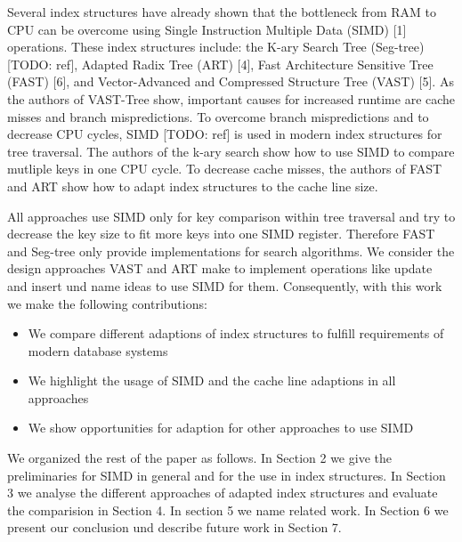 \documentclass[conference]{IEEEtran}
\begin{document}
Several index structures have already shown that the bottleneck from RAM to CPU can be overcome using Single Instruction Multiple Data (SIMD) [1] operations. These index structures include: the K-ary Search Tree (Seg-tree) [TODO: ref], Adapted Radix Tree (ART) [4], Fast Architecture Sensitive Tree (FAST) [6], and Vector-Advanced and Compressed Structure Tree (VAST) [5]. As the authors of VAST-Tree show, important causes for increased runtime are cache misses and branch mispredictions. To overcome branch mispredictions and to decrease CPU cycles, SIMD [TODO: ref] is used in modern index structures for tree traversal. The authors of the k-ary search show how to use SIMD to compare mutliple keys in one CPU cycle. To decrease cache misses, the authors of FAST and ART show how to adapt index structures to the cache line size.  

All approaches use SIMD only for key comparison within tree traversal and try to decrease the key size to fit more keys into one SIMD register. Therefore FAST and Seg-tree only provide implementations for search algorithms. We consider the design approaches VAST and ART make to implement operations like update and insert und name ideas to use SIMD for them. Consequently, with this work we make the following contributions:
\begin{itemize}
	\item We compare different adaptions of index structures to fulfill requirements of modern database systems
	\item We highlight the usage of SIMD and the cache line adaptions in all approaches
	\item We show opportunities for adaption for other approaches to use SIMD
\end{itemize}
We organized the rest of the paper as follows. In Section 2 we give the preliminaries for SIMD in general and for the use in index structures. In Section 3 we analyse the different approaches of adapted index structures and evaluate the comparision in Section 4. In section 5 we name related work. In Section 6 we present our conclusion und describe future work in Section 7. 
\end{document}

